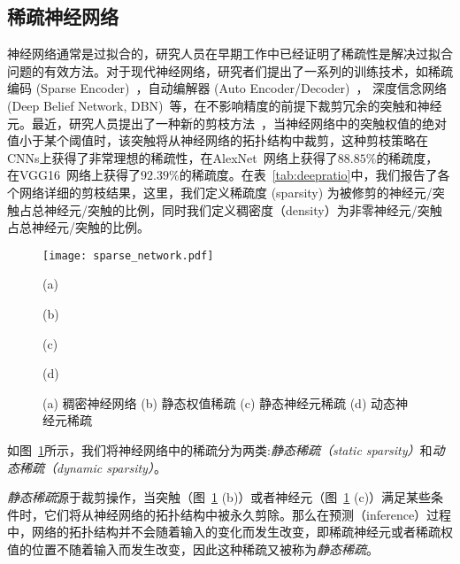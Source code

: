 \subsection{稀疏神经网络}

神经网络通常是过拟合的，研究人员在早期工作中已经证明了稀疏性是解决过拟合问题的有效方法。对于现代神经网络，研究者们提出了一系列的训练技术，如稀疏编码 (Sparse Encoder)~\cite{olshausen1996emergence}，自动编解器 (Auto Encoder/Decoder)~\cite{boureau2008sparse,lee2008sparse}， 深度信念网络 (Deep Belief Network, DBN)~\cite{lee2007efficient}等，在不影响精度的前提下裁剪冗余的突触和神经元。最近，研究人员提出了一种新的剪枝方法~\cite{han2015learning}，当神经网络中的突触权值的绝对值小于某个阈值时，该突触将从神经网络的拓扑结构中裁剪，这种剪枝策略在CNNs上获得了非常理想的稀疏性，在AlexNet~\cite{krizhevsky2012imagenet}网络上获得了$88.85\%$的稀疏度， 在VGG16~\cite{simonyan2014very}网络上获得了$92.39\%$的稀疏度。在表~\ref{tab:deepratio}中，我们报告了各个网络详细的剪枝结果，这里，我们定义稀疏度 (sparsity) 为被修剪的神经元/突触占总神经元/突触的比例，同时我们定义稠密度（density）为非零神经元/突触占总神经元/突触的比例。


\begin{figure}[h]
  \centering
  \begin{minipage}[t]{\columnwidth}
  \texttt{[image: sparse\_network.pdf]}
  \end{minipage}
  \vfill
  \begin{minipage}[t]{0.24\columnwidth}
      \centering\footnotesize
    (a)
  \end{minipage}
  \hfill
  \begin{minipage}[t]{0.24\columnwidth}
      \centering\footnotesize
    (b)
  \end{minipage}
  \hfill
  \begin{minipage}[t]{0.24\columnwidth}
      \centering\footnotesize
    (c)
  \end{minipage}
    \hfill
  \begin{minipage}[t]{0.24\columnwidth}
      \centering\footnotesize
    (d)
  \end{minipage}
  \caption{ (a) 稠密神经网络 (b) 静态权值稀疏 (c) 静态神经元稀疏 (d) 动态神经元稀疏}
  \label{fig:sparsity}
\end{figure}

如图~\ref{fig:sparsity}所示，我们将神经网络中的稀疏分为两类:\emph{静态稀疏（static sparsity）}和\emph{动态稀疏（dynamic sparsity）}。

\emph{静态稀疏}源于裁剪操作，当突触（图~\ref{fig:sparsity} (b)）或者神经元（图~\ref{fig:sparsity} (c)）满足某些条件时，它们将从神经网络的拓扑结构中被永久剪除。那么在预测（inference）过程中，网络的拓扑结构并不会随着输入的变化而发生改变，即稀疏神经元或者稀疏权值的位置不随着输入而发生改变，因此这种稀疏又被称为\emph{静态稀疏}。

